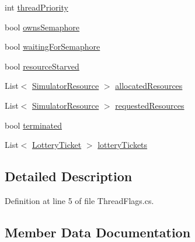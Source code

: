 \begin{DoxyCompactItemize}
\item 
int \hyperlink{struct_c_p_u___o_s___simulator_1_1_operating___system_1_1_threading_1_1_thread_flags_a1183510de09fd457d2ffd281e09bc9c4}{thread\+Priority}
\item 
bool \hyperlink{struct_c_p_u___o_s___simulator_1_1_operating___system_1_1_threading_1_1_thread_flags_a05c61a19f2ce3a9239896e9720580c0a}{owns\+Semaphore}
\item 
bool \hyperlink{struct_c_p_u___o_s___simulator_1_1_operating___system_1_1_threading_1_1_thread_flags_ad519fd59ad20838f252f66885d7b9357}{waiting\+For\+Semaphore}
\item 
bool \hyperlink{struct_c_p_u___o_s___simulator_1_1_operating___system_1_1_threading_1_1_thread_flags_aa5000831e8efc8a6c9c2fcc6e602044d}{resource\+Starved}
\item 
List$<$ \hyperlink{class_c_p_u___o_s___simulator_1_1_operating___system_1_1_simulator_resource}{Simulator\+Resource} $>$ \hyperlink{struct_c_p_u___o_s___simulator_1_1_operating___system_1_1_threading_1_1_thread_flags_abe528720dcf27f540d51dd97231ca989}{allocated\+Resources}
\item 
List$<$ \hyperlink{class_c_p_u___o_s___simulator_1_1_operating___system_1_1_simulator_resource}{Simulator\+Resource} $>$ \hyperlink{struct_c_p_u___o_s___simulator_1_1_operating___system_1_1_threading_1_1_thread_flags_ac6e85e7ef7ada7466a58d1c8f7e15640}{requested\+Resources}
\item 
bool \hyperlink{struct_c_p_u___o_s___simulator_1_1_operating___system_1_1_threading_1_1_thread_flags_a6e3031c842d5751cde6732b40f600834}{terminated}
\item 
List$<$ \hyperlink{class_c_p_u___o_s___simulator_1_1_operating___system_1_1_lottery_ticket}{Lottery\+Ticket} $>$ \hyperlink{struct_c_p_u___o_s___simulator_1_1_operating___system_1_1_threading_1_1_thread_flags_a0d79cd3049072a7573cad5b3dcb35419}{lottery\+Tickets}
\end{DoxyCompactItemize}


\subsection{Detailed Description}


Definition at line 5 of file Thread\+Flags.\+cs.



\subsection{Member Data Documentation}
\hypertarget{struct_c_p_u___o_s___simulator_1_1_operating___system_1_1_threading_1_1_thread_flags_abe528720dcf27f540d51dd97231ca989}{}
